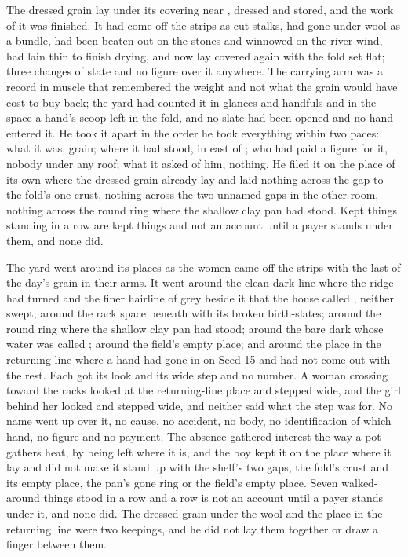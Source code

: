 The dressed grain lay under its covering near , dressed and stored, and the work of it was finished. It had come off the strips as cut stalks, had gone under wool as a bundle, had been beaten out on the stones and winnowed on the river wind, had lain thin to finish drying, and now lay covered again with the fold set flat; three changes of state and no figure over it anywhere. The carrying arm was a record in muscle that remembered the weight and not what the grain would have cost to buy back; the yard had counted it in glances and handfuls and in the space a hand's scoop left in the fold, and no slate had been opened and no hand entered it. He took it apart in the order he took everything within two paces: what it was, grain; where it had stood, in  east of ; who had paid a figure for it, nobody under any roof; what it asked of him, nothing. He filed it on the place of its own where the dressed grain already lay and laid nothing across the gap to the fold's one crust, nothing across the two unnamed gaps in the other room, nothing across the round ring where the shallow clay pan had stood. Kept things standing in a row are kept things and not an account until a payer stands under them, and none did.

\scenebreak

The yard went around its places as the women came off the strips with the last of the day's grain in their arms. It went around the clean dark line where the  ridge had turned and the finer hairline of grey beside it that the house called , neither swept; around the rack space beneath  with its broken birth-slates; around the round ring where the shallow clay pan had stood; around the bare dark  whose water was called ; around the field's empty place; and around the place in the returning line where a hand had gone in on Seed 15 and had not come out with the rest. Each got its look and its wide step and no number. A woman crossing toward the racks looked at the returning-line place and stepped wide, and the girl behind her looked and stepped wide, and neither said what the step was for. No name went up over it, no cause, no accident, no body, no identification of which hand, no figure and no payment. The absence gathered interest the way a pot gathers heat, by being left where it is, and the boy kept it on the place where it lay and did not make it stand up with the shelf's two gaps, the fold's crust and its empty place, the pan's gone ring or the field's empty place. Seven walked-around things stood in a row and a row is not an account until a payer stands under it, and none did. The dressed grain under the wool and the place in the returning line were two keepings, and he did not lay them together or draw a finger between them.

